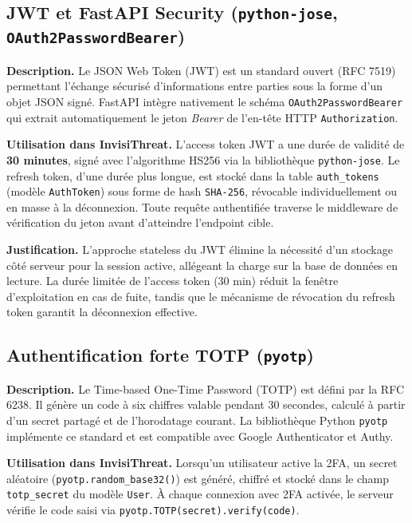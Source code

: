 \subsection{JWT et FastAPI Security (\texttt{python-jose}, \texttt{OAuth2PasswordBearer})}

\textbf{Description.} Le JSON Web Token (JWT) est un standard ouvert (RFC 7519) permettant l'échange sécurisé d'informations entre parties sous la forme d'un objet JSON signé. FastAPI intègre nativement le schéma \texttt{OAuth2PasswordBearer} qui extrait automatiquement le jeton \textit{Bearer} de l'en-tête HTTP \texttt{Authorization}.

\textbf{Utilisation dans InvisiThreat.} L'access token JWT a une durée de validité de \textbf{30 minutes}, signé avec l'algorithme HS256 via la bibliothèque \texttt{python-jose}. Le refresh token, d'une durée plus longue, est stocké dans la table \texttt{auth\_tokens} (modèle \texttt{AuthToken}) sous forme de hash \texttt{SHA-256}, révocable individuellement ou en masse à la déconnexion. Toute requête authentifiée traverse le middleware de vérification du jeton avant d'atteindre l'endpoint cible.

\textbf{Justification.} L'approche stateless du JWT élimine la nécessité d'un stockage côté serveur pour la session active, allégeant la charge sur la base de données en lecture. La durée limitée de l'access token (30 min) réduit la fenêtre d'exploitation en cas de fuite, tandis que le mécanisme de révocation du refresh token garantit la déconnexion effective.

\subsection{Authentification forte TOTP (\texttt{pyotp})}

\textbf{Description.} Le Time-based One-Time Password (TOTP) est défini par la RFC 6238. Il génère un code à six chiffres valable pendant 30 secondes, calculé à partir d'un secret partagé et de l'horodatage courant. La bibliothèque Python \texttt{pyotp} implémente ce standard et est compatible avec Google Authenticator et Authy.

\textbf{Utilisation dans InvisiThreat.} Lorsqu'un utilisateur active la 2FA, un secret aléatoire (\texttt{pyotp.random\_base32()}) est généré, chiffré et stocké dans le champ \texttt{totp\_secret} du modèle \texttt{User}. À chaque connexion avec 2FA activée, le serveur vérifie le code saisi via \texttt{pyotp.TOTP(secret).verify(code)}.

